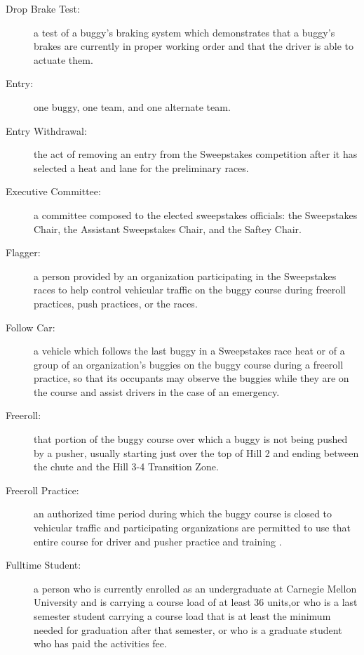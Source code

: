 \begin{description}
	\item[Drop Brake Test:]
	a test of a buggy's braking system which demonstrates that a buggy's brakes
	are currently in proper working order and that the driver is able to actuate
	them.

	\item[Entry:]
	one buggy, one team, and one alternate team.

	\item[Entry Withdrawal:]
	the act of removing an entry from the Sweepstakes competition after it has
	selected a heat and lane for the preliminary races.

	\item[Executive Committee:]
	a committee composed to the elected sweepstakes officials: the Sweepstakes
	Chair, the Assistant Sweepstakes Chair, and the Saftey Chair.	

	\item[Flagger:]
	a person provided by an organization participating in the Sweepstakes races
	to help control vehicular traffic on the buggy course during freeroll
	practices, push practices, or the races.

	\item[Follow Car:]
	a vehicle which follows the last buggy in a Sweepstakes race heat or of a
	group of an organization's buggies on the buggy course during a freeroll
	practice, so that its occupants may observe the buggies while they are on the
	course and assist drivers in the case of an emergency.

	\item[Freeroll:]
	that portion of the buggy course over which a buggy is not being pushed by
	a pusher, usually starting just over the top of Hill 2 and ending between the
	chute and the Hill 3-4 Transition Zone.

	\item[Freeroll Practice:]
	an authorized time period during which the buggy course is closed to
	vehicular traffic and participating organizations are permitted to use that
	entire course for driver and pusher practice and training .

	\item[Fulltime Student:]
	a person who is currently enrolled as an undergraduate at Carnegie Mellon
	University and is carrying a course load of at least 36 units,or who is a last
	semester student carrying a course load that is at least the minimum needed for
	graduation after that semester, or who is a graduate student who has paid the
	activities fee.


\end{description}
